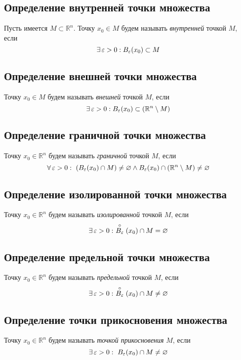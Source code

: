 \documentclass[a4paper]{article}
\begin{document}

\subsection{Определение внутренней точки множества}
 Пусть имеется $M\subset\mathbb{R}^n$. Точку $x_0\in M$ будем называть \textit{внутренней} точкой $M$, если $$\exists\operatorname{\varepsilon}>0:B_{\operatorname{\varepsilon}}(x_0)\subset M$$

\subsection{Определение внешней точки множества}
 Точку $x_0\in M$ будем называть \textit{внешней} точкой $M$, если $$\exists\operatorname{\varepsilon}>0:B_{\operatorname{\varepsilon}}(x_0)\subset (\mathbb{R}^n\setminus M)$$

\subsection{Определение граничной точки множества}
 Точку $x_0\in\mathbb{R}^n$ будем называть \textit{граничной} точкой $M$, если $$\forall \ve>0:\ \left(B_{\ve}(x_0)\cap M\right)\ne\varnothing\wedge B_{\ve}(x_0)\cap(\mathbb{R}^n\setminus M)\ne\varnothing$$ 

\subsection{Определение изолированной точки множества}
 Точку $x_0\in\mathbb{R}^n$ будем называть \textit{изолированной} точкой $M$, если $$\exists \ve>0:\ \stackrel{\circ}{B_{\ve}}(x_0)\cap M=\varnothing$$ 

\subsection{Определение предельной точки множества}
 Точку $x_0\in\mathbb{R}^n$ будем называть \textit{предельной} точкой $M$, если $$\exists \ve>0:\ \stackrel{\circ}{B_{\ve}}(x_0)\cap M\ne\varnothing$$ 

\subsection{Определение точки прикосновения множества}
 Точку $x_0\in\mathbb{R}^n$ будем называть \textit{точкой прикосновения} $M$, если $$\exists \operatorname{\varepsilon}>0:\ B_{\operatorname{\varepsilon}}(x_0)\cap M\ne\varnothing$$ 
\end{document}
